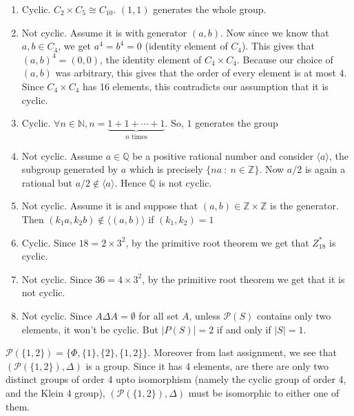 \documentclass[12pt]{exam}
\theoremstyle{plain} %
\theoremstyle{definition} %
\theoremstyle{remark} %
\begin{document}
\begin{questions}
  \question
  \begin{solution}
     \begin{enumerate}[label=(\alph*)]
       \item Cyclic. $C_2 \times C_5 \cong C_{10}$. $(1, 1)$ generates the whole group.
       \item Not cyclic. Assume it is with generator $(a, b)$. Now since we know that $a, b \in C_4$, we get  $a^4 = b^4 = 0$ (identity element of $C_4$). This gives that $(a, b)^4 = (0, 0)$, the identity element of $C_4 \times C_4$. Because our choice of $(a, b)$ was arbitrary, this gives that the order of every element is at most $4$. Since $C_4 \times C_4$ has 16 elements, this contradicts our assumption that it is cyclic.
       \item Cyclic. $\forall n \in \mathbb{N}, n = \underbrace{1+1+\cdots+1}_{n \textrm{ times}}$. So, $1$ generates the group
       \item Not cyclic. Assume $a \in \mathbb{Q}$ be a positive rational number and consider $\langle  a \rangle $, the subgroup generated by $a$ which is precisely $ \{ na \ : \ n \in \mathbb{Z} \}$. Now $a/2$ is again a rational  but $a/2 \notin \langle a \rangle$. Hence $\mathbb{Q}$ is not cyclic.
       \item Not cyclic. Assume it is and suppose that $(a, b) \in \mathbb{Z} \times \mathbb{Z}$ is the generator. Then $(k_1a, k_2b) \not\in \langle (a, b) \rangle$ if $(k_1, k_2) = 1$
       \item Cyclic. Since $18 = 2\times3^2$, by the primitive root theorem we get that $Z_{18}^{*}$ is cyclic.
       \item Not cyclic. Since $36 = 4 \times 3^2$, by the primitive root theorem we get that it is not cyclic.
       \item Not cyclic. Since $A \Delta A = \emptyset$ for all set $A$, unless $\mathcal{P}(S)$ contains only two elements, it won't be cyclic. But $|P(S)| = 2$ if and only if $|S| = 1$.
     \end{enumerate}
  \end{solution}


  \question
  \begin{solution}
    $\mathcal{P}(\{ 1, 2 \}) = \{  \Phi, \{ 1 \}, \{ 2 \}, \{ 1, 2 \} \}$. Moreover from last assignment, we see that $(\mathcal{P}(\{ 1, 2 \}), \Delta)$ is a group. Since it has 4 elements, are there are only two distinct groups of order 4 upto isomorphism (namely the cyclic group of order 4, and the Klein 4 group), $(\mathcal{P}(\{ 1, 2 \}), \Delta)$ must be isomorphic to either one of them. 


\end{solution}
\end{questions}
\end{document}
